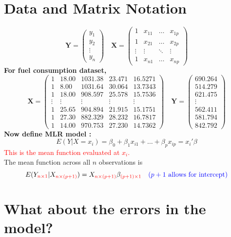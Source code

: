 \documentclass[14pt]{extarticle}
\begin{document}
\section*{Data and Matrix Notation}
\[
\mathbf{Y} =
\begin{pmatrix}
y_1 \\
y_2 \\
\vdots \\
y_n
\end{pmatrix}
\quad
\mathbf{X} =
\begin{pmatrix}
1 & x_{11} & \dots & x_{1p} \\
1 & x_{21} & \dots & x_{2p} \\
\vdots & \vdots & \ddots & \vdots \\
1 & x_{n1} & \dots & x_{np}
\end{pmatrix}
\]
\noindent
\textbf{For fuel consumption dataset,}
\[
\mathbf{X} = 
\begin{pmatrix}
1 & 18.00 & 1031.38 & 23.471 & 16.5271 \\
1 & 8.00  & 1031.64 & 30.064 & 13.7343 \\
1 & 18.00 & 908.597 & 25.578 & 15.7536 \\
\vdots & \vdots & \vdots & \vdots & \vdots \\
1 & 25.65 & 904.894 & 21.915 & 15.1751 \\
1 & 27.30 & 882.329 & 28.232 & 16.7817 \\
1 & 14.00 & 970.753 & 27.230 & 14.7362
\end{pmatrix}
\quad
\mathbf{Y} = 
\begin{pmatrix}
690.264 \\
514.279 \\
621.475 \\
\vdots \\
562.411 \\
581.794 \\
842.792
\end{pmatrix}
\]
\noindent
\textbf{Now define MLR model :}
\[
E(Y | X = x_i) = \beta_0 + \beta_1 x_{i1} + \dots + \beta_p x_{ip} = x_i' \beta
\]
\noindent
\textcolor{red}{This is the mean function evaluated at $x_i$.}\\
\noindent
The mean function across all $n$ observations is
\[
E(Y_{\textcolor{red}{n \times 1}} | X_{\textcolor{red}{n \times (p+1)}}) = X_{\textcolor{red}{n \times (p+1)}} \beta_{\textcolor{red}{(p+1) \times 1}}
\textcolor{blue}{\quad (p+1 \text{ allows for intercept})}
\]


\section*{What about the errors in the model?}
\end{document}
